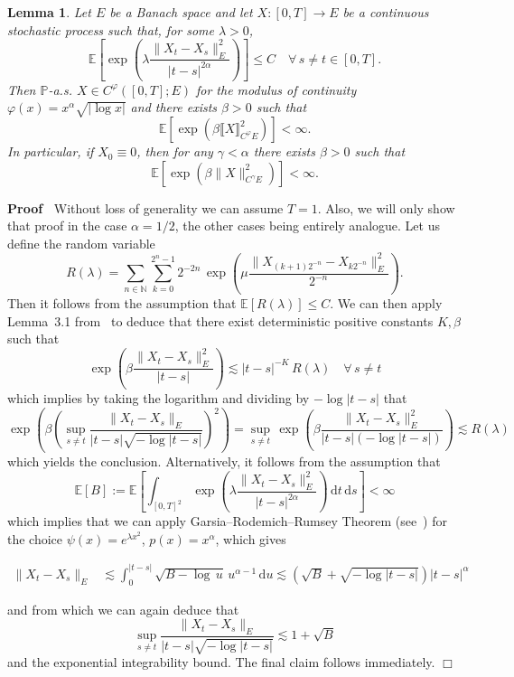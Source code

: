 \documentclass[10pt]{article}
\newcommand{\assign}{:=}
\newcommand{\mathd}{\mathrm{d}}
\newenvironment{proof}{\noindent\textbf{Proof\ }}{\hspace*{\fill}$\Box$\medskip}
\newtheorem{lemma}[theorem]{Lemma}
\begin{document}
\begin{lemma}
  \label{appendixA2 chaining lemma}Let $E$ be a Banach space and let $X : [0,
  T] \rightarrow E$ be a continuous stochastic process such that, for some
  $\lambda > 0$,
  \begin{equation}
    \mathbb{E} \left[ \exp \left( \lambda \frac{\| X_t - X_s \|^2_E}{| t - s
    |^{2 \alpha}} \right) \right] \leqslant C \quad \forall \, s \neq t \in
    [0, T] .
  \end{equation}
  Then $\mathbb{P}$-a.s. $X \in C^{\varphi} ([0, T] ; E)$ for the modulus of
  continuity $\varphi (x) = x^{\alpha} \sqrt{| \log x |}$ and there exists
  $\beta > 0$ such that
  \[ \mathbb{E} [\exp (\beta \llbracket X \rrbracket^2_{C^{\varphi} E})] <
     \infty . \]
  In particular, if $X_0 \equiv 0$, then for any $\gamma < \alpha$ there
  exists $\beta > 0$ such that
  \[ \mathbb{E} [\exp (\beta \| X \|^2_{C^{\gamma} E})] < \infty . \]
\end{lemma}

\begin{proof}
  Without loss of generality we can assume $T = 1$. Also, we will only show
  that proof in the case $\alpha = 1 / 2$, the other cases being entirely
  analogue. Let us define the random variable
  \[ R (\lambda) = \sum_{n \in \mathbb{N}} \sum_{k = 0}^{2^n - 1} 2^{- 2 n} \,
     \exp \left( \mu \frac{\| X_{(k + 1) 2^{- n}} - X_{k 2^{- n}} \|^2_E}{2^{-
     n}} \right) . \]
  Then it follows from the assumption that $\mathbb{E} [R (\lambda)] \leqslant
  C$. We can then apply Lemma~3.1 from~{\cite{catelliergubinelli}} to deduce
  that there exist deterministic positive constants $K, \beta$ such that
  \[ \exp \left( \beta \frac{\| X_t - X_s \|^2_E}{| t - s |} \right) \lesssim
     | t - s |^{- K} \, R (\lambda) \quad \forall \, s \neq t \]
  which implies by taking the logarithm and dividing by $- \log | t - s |$
  that
  \[ \exp \left( \beta \left( \sup_{s \neq t} \frac{\| X_t - X_s \|_E}{| t - s
     | \sqrt{- \log | t - s |}} \right)^2 \right) = \sup_{s \neq t} \, \exp
     \left( \beta \frac{\| X_t - X_s \|^2_E}{| t - s | (- \log | t - s |)}
     \right) \lesssim R (\lambda) \]
  which yields the conclusion. Alternatively, it follows from the assumption
  that
  \[ \mathbb{E} [B] \assign \mathbb{E} \left[ \int_{[0, T]^2} \exp \left(
     \lambda \frac{\| X_t - X_s \|^2_E}{| t - s |^{2 \alpha}} \right) \,
     \mathd t \, \mathd s \right] < \infty \]
  which implies that we can apply Garsia--Rodemich--Rumsey Theorem
  (see~{\cite{garsia}}) for the choice $\psi (x) = e^{\lambda x^2}$, $p (x) =
  x^{\alpha}$, which gives
  
  \begin{align}
    \| X_t - X_s \|_E & \lesssim \int_0^{| t - s |} \sqrt{B - \log \, u} \,
    u^{\alpha - 1} \, \mathd u \lesssim \left( \sqrt{B} + \sqrt{- \log | t - s
    |} \right) | t - s |^{\alpha}
  \end{align}
  
  and from which we can again deduce that
  \[ \sup_{s \neq t} \frac{\| X_t - X_s \|_E}{| t - s | \sqrt{- \log | t - s
     |}} \lesssim 1 + \sqrt{B} \]
  and the exponential integrability bound. The final claim follows
  immediately.
\end{proof}
\end{document}
